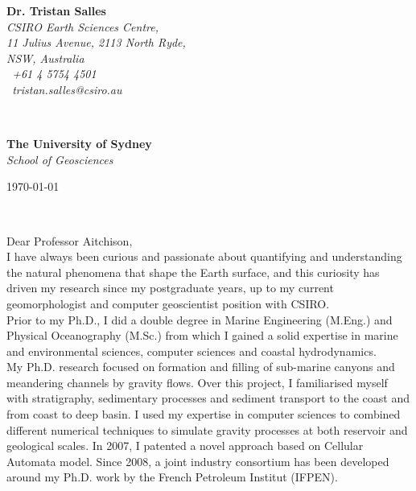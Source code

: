 \documentclass[11pt]{article}
\begin{document}
\hfill%
\begin{minipage}[t]{.6\textwidth}
\raggedleft%
{\bfseries \small Dr. Tristan Salles}\\[.35ex]
\small\itshape%
CSIRO Earth Sciences Centre, \\
11 Julius Avenue, 2113 North Ryde, \\
NSW, Australia\\[.35ex]
\Telefon~+61 4 5754 4501\\
\Letter~{tristan.salles@csiro.au}
\end{minipage}\\[1em]
%
\begin{minipage}[t]{.94\textwidth}
\raggedright%
{\bfseries The University of Sydney}\\[.0ex]
\small\itshape%
School of Geosciences
\end{minipage}
\hfill %
\begin{minipage}[t]{.4\textwidth}
\raggedleft %
\today
\end{minipage}\\[2em]
\begin{minipage}[t]{.7\textwidth}
\raggedright%
\vspace{-0.5cm}
\end{minipage}

Dear Professor Aitchison,\\

I have always been curious and passionate about quantifying and understanding the natural phenomena that shape the Earth surface, and this curiosity has driven my research since my postgraduate years, up to my current geomorphologist and computer geoscientist position with CSIRO.\\

Prior to my Ph.D., I did a double degree in Marine Engineering (M.Eng.) and Physical Oceanography (M.Sc.) from which I gained a solid expertise in marine and environmental sciences, computer sciences and coastal hydrodynamics. \\

My Ph.D. research focused on formation and filling of sub-marine canyons and meandering channels by gravity flows.  Over this project, I familiarised myself with stratigraphy, sedimentary processes and sediment transport to the coast and from coast to deep basin.  I used my expertise in computer sciences to combined different numerical techniques to simulate gravity processes at both reservoir and geological scales. In 2007, I patented a novel approach  based on Cellular Automata model. Since 2008, a joint industry consortium has been developed around my Ph.D. work by the French Petroleum Institut (IFPEN).\\
\end{document}
